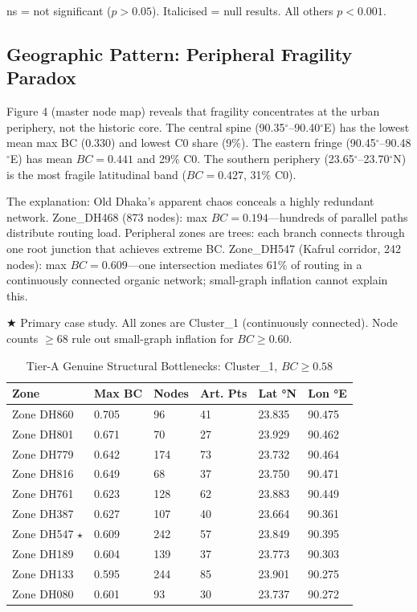 \documentclass[sigconf, nonacm]{acmart}
\begin{document}
ns = not significant ($p>0.05$). Italicised = null results. All others $p<0.001$.

\subsection{Geographic Pattern: Peripheral Fragility Paradox}

Figure 4 (master node map) reveals that fragility concentrates at the urban periphery, not the historic core. The central spine (90.35$^\circ$--90.40$^\circ$E) has the lowest mean max BC (0.330) and lowest C0 share (9\%). The eastern fringe (90.45$^\circ$--90.48$^\circ$E) has mean $BC = 0.441$ and 29\% C0. The southern periphery (23.65$^\circ$--23.70$^\circ$N) is the most fragile latitudinal band ($BC = 0.427$, 31\% C0). 

The explanation: Old Dhaka's apparent chaos conceals a highly redundant network. Zone\_DH468 (873 nodes): max $BC = 0.194$—hundreds of parallel paths distribute routing load. Peripheral zones are trees: each branch connects through one root junction that achieves extreme BC. Zone\_DH547 (Kafrul corridor, 242 nodes): max $BC = 0.609$—one intersection mediates 61\% of routing in a continuously connected organic network; small-graph inflation cannot explain this.

★ Primary case study. All zones are Cluster\_1 (continuously connected). Node counts $\geq 68$ rule out small-graph inflation for $BC \geq 0.60$.



\begin{table}[h]
\caption{Tier-A Genuine Structural Bottlenecks: Cluster\_1, $BC\ge0.58$}
\begin{tabular}{llllll}
\toprule
Zone & Max BC & Nodes & Art. Pts & Lat °N & Lon °E \\
\midrule
Zone DH860 & 0.705 & 96 & 41 & 23.835 & 90.475 \\
Zone DH801 & 0.671 & 70 & 27 & 23.929 & 90.462 \\
Zone DH779 & 0.642 & 174 & 73 & 23.732 & 90.464 \\
Zone DH816 & 0.649 & 68 & 37 & 23.750 & 90.471 \\
Zone DH761 & 0.623 & 128 & 62 & 23.883 & 90.449 \\
Zone DH387 & 0.627 & 107 & 40 & 23.664 & 90.361 \\
Zone DH547 $\star$ & 0.609 & 242 & 57 & 23.849 & 90.395 \\
Zone DH189 & 0.604 & 139 & 37 & 23.773 & 90.303 \\
Zone DH133 & 0.595 & 244 & 85 & 23.901 & 90.275 \\
Zone DH080 & 0.601 & 93 & 30 & 23.737 & 90.272 \\
\bottomrule
\end{tabular}
\end{table}
\end{document}

